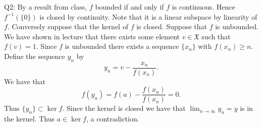 \documentclass[letterpaper]{article}
\newcommand{\X}{\mathfrak{X}}
\begin{document}
\noindent Q2: By a result from class, $f$ bounded if and only if $f$ is continuous. Hence $f^{-1}(\{0\})$ is closed by continuity. Note that it is a linear subspace by linearity of $f$. Conversely suppose that the kernel of $f$ is closed. 
Suppose that $f$ is unbounded. We have shown in lecture that there exists some element $v\in \X$ such that $f(v)=1$. Since $f$ is unbounded there exists a sequence $\{x_n\}$ with $f(x_n) \geq n$. Define the sequence $y_n$ by $$y_n = v - \frac{x_n}{f(x_n)}.$$ We have that $$f(y_n) = f(a) - \frac{f(x_n)}{f(x_n)} = 0.$$ Thus $\{y_n\} \subset \ker f$. Since the kernel is closed we have that $\lim_{n\to \infty}y_n = y$ is in the kernel. Thus $a\in \ker f$, a contradiction.
\end{document}
